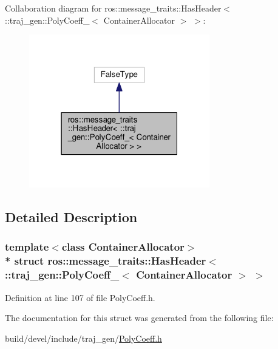 Collaboration diagram for ros\+:\+:message\+\_\+traits\+:\+:Has\+Header$<$ \+:\+:traj\+\_\+gen\+:\+:Poly\+Coeff\+\_\+$<$ Container\+Allocator $>$ $>$\+:
\nopagebreak
\begin{figure}[H]
\begin{center}
\leavevmode
\includegraphics[width=223pt]{structros_1_1message__traits_1_1_has_header_3_01_1_1traj__gen_1_1_poly_coeff___3_01_container_allocator_01_4_01_4__coll__graph}
\end{center}
\end{figure}


\subsection{Detailed Description}
\subsubsection*{template$<$class Container\+Allocator$>$\\*
struct ros\+::message\+\_\+traits\+::\+Has\+Header$<$ \+::traj\+\_\+gen\+::\+Poly\+Coeff\+\_\+$<$ Container\+Allocator $>$ $>$}



Definition at line 107 of file Poly\+Coeff.\+h.



The documentation for this struct was generated from the following file\+:\begin{DoxyCompactItemize}
\item 
build/devel/include/traj\+\_\+gen/\hyperlink{_poly_coeff_8h}{Poly\+Coeff.\+h}\end{DoxyCompactItemize}

